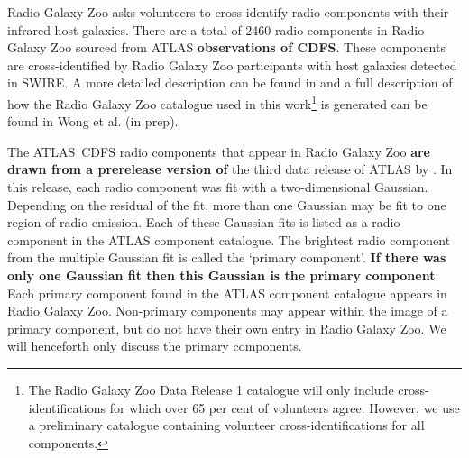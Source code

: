 \documentclass[fleqn,usenatbib,usedcolumn]{mnras}
\newcommand{\edited}[1]{{\bf {#1}}}
\begin{document}
    Radio Galaxy Zoo asks volunteers to cross-identify radio components with
    their infrared host galaxies. There are a total of 2460 radio components
    in Radio Galaxy Zoo sourced from ATLAS \edited{observations of CDFS}. These components are
    cross-identified by Radio Galaxy Zoo participants with host galaxies
    detected in SWIRE. A more detailed description can be found in
    \citet{banfield15} and a full description of how the Radio Galaxy Zoo catalogue used in this work\footnote{The Radio Galaxy Zoo Data
    Release 1 catalogue will only include cross-identifications for which over
    65 per cent of volunteers agree. However, we use a preliminary catalogue containing volunteer
    cross-identifications for all components.} is generated can be found in Wong
    et al. (in prep).

    The ATLAS~CDFS radio components that appear in Radio Galaxy Zoo \edited{are drawn from a prerelease version of} the third data release
    of ATLAS by \citet{franzen15}. In this release, each radio component was fit with a
    two-dimensional Gaussian. Depending on the residual of the fit, more than
    one Gaussian may be fit to one region of radio emission. Each of these
    Gaussian fits is listed as a radio component in the ATLAS component catalogue. The
    brightest radio component from the multiple Gaussian fit is called the
    `primary component'. \edited{If there was only one Gaussian fit then this Gaussian is the primary component}. Each primary component found in the ATLAS
    component catalogue appears in Radio Galaxy Zoo. Non-primary components
    may appear within the image of a primary component, but do not have their
    own entry in Radio Galaxy Zoo. We will henceforth only discuss the primary
    components.
\end{document}
